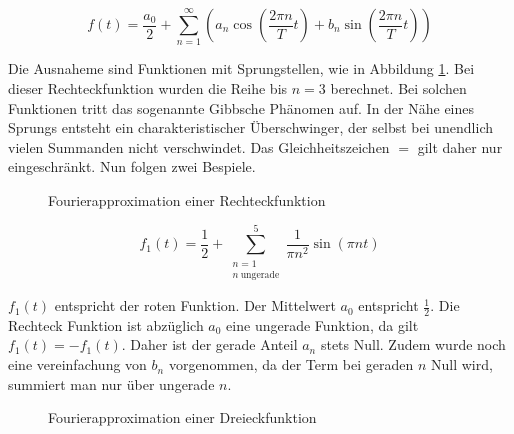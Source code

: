\begin{equation}
f(t) = \frac{a_0}{2} + \sum_{n=1}^{\infty} \left( a_n \cos\left( \frac{2\pi n}{T} t \right) + b_n \sin\left( \frac{2\pi n}{T} t \right) \right)
\end{equation}


Die Ausnaheme sind Funktionen mit Sprungstellen, wie in Abbildung \ref{fourier:fourierrechteck}.
Bei dieser Rechteckfunktion wurden die Reihe bis $n = 3$ berechnet. 
Bei solchen Funktionen tritt das sogenannte Gibbsche Phänomen auf.
In der Nähe eines Sprungs entsteht ein charakteristischer Überschwinger, der selbst bei unendlich vielen Summanden nicht verschwindet.
Das Gleichheitszeichen $=$ gilt daher nur eingeschränkt. 
Nun folgen zwei Bespiele.



\begin{figure}[H]
	\centering
	\caption{Fourierapproximation einer Rechteckfunktion}
	\label{fourier:fourierrechteck}
\end{figure}

\begin{equation}
	f_1(t) = \frac{1}{2} + \sum_{\substack{n=1 \\ n\ \text{ungerade}}}^{5} \frac{1}{\pi n^2} \sin\left( \pi n t \right)
\end{equation}

$f_1(t)$ entspricht der roten Funktion. 
Der Mittelwert $a_0$ entspricht $\frac{1}{2}$. 
Die Rechteck Funktion ist abzüglich $a_0$ eine ungerade Funktion, da gilt $f_1(t) = -f_1(t)$. 
Daher ist der gerade Anteil $a_n$ stets Null. 
Zudem wurde noch eine vereinfachung von $b_n$ vorgenommen, da der Term bei geraden $n$ Null wird, summiert man nur über ungerade $n$. 


\begin{figure}[H]
	\centering
	\caption{Fourierapproximation einer Dreieckfunktion}
	\label{fourier:fourierdreieck}
\end{figure}

